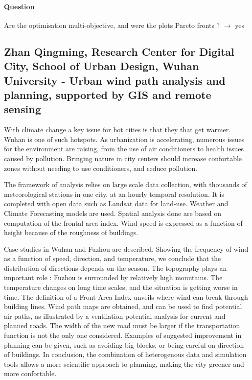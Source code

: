 \documentclass[10pt]{article}
\begin{document}
\paragraph{Question}

Are the optimisation multi-objective, and were the plots Pareto fronts ? $\rightarrow$ yes





\subsection*{Zhan Qingming, Research Center for Digital City, School of Urban Design, Wuhan University - Urban wind path analysis and planning, supported by GIS and remote sensing}


With climate change a key issue for hot cities is that they that get warmer. Wuhan is one of such hotspots. As urbanization is accelerating, numerous issues for the environment are raising, from the use of air conditioners to health issues caused by pollution. Bringing nature in city centers should increase confortable zones without needing to use conditioners, and reduce pollution.


The framework of analysis relies on large scale data collection, with thousands of meteorological stations in one city, at an hourly temporal resolution. It is completed with open data such as Landsat data for land-use. Weather and Climate Forecasting models are used. Spatial analysis done are based on computation of the frontal area index. Wind speed is expressed as a function of height because of the roughness of buildings.

Case studies in Wuhan and Fuzhou are described. Showing the frequency of wind as a function of speed, direction, and temperature, we conclude that the distribution of directions depends on the season. The topography plays an important role : Fuzhou is surrounded by relatively high mountains. The temperature changes on long time scales, and the situation is getting worse in time. The definition of a Front Area Index unveils where wind can break through building lines. Wind path maps are obtained, and can be used to find potential air paths, as illustrated by a ventilation potential analysis for current and planned roads. The width of the new road must be larger if the transportation function is not the only one considered. Examples of suggested improvement in planning can be given, such as avoiding big blocks, or being careful on direction of buildings. In conclusion, the combination of heterogenous data and simulation tools allows a more scientific approach to planning, making the city greener and more confortable.
\end{document}
